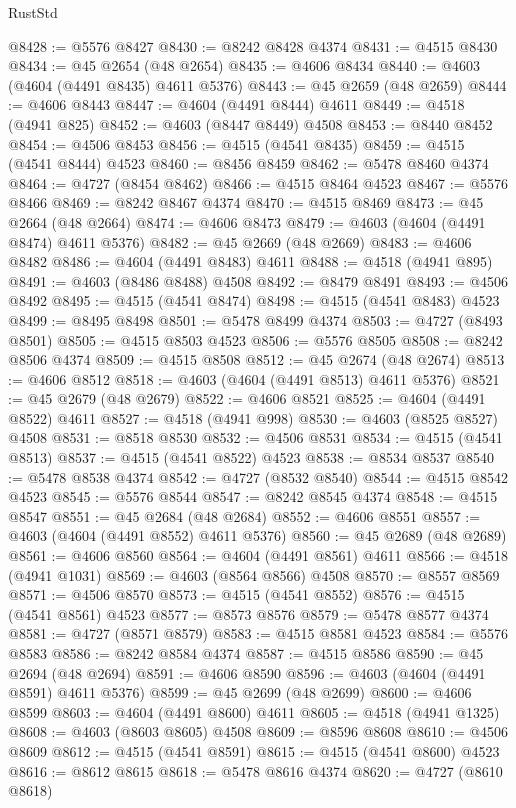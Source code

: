 \begin{lexlean}{RustStd}
\begin{coremodule}
@8428 := @5576 @8427
@8430 := @8242 @8428 @4374
@8431 := @4515 @8430
@8434 := @45 @2654 (@48 @2654)
@8435 := @4606 @8434
@8440 := @4603 (@4604 (@4491 @8435) @4611 @5376)
@8443 := @45 @2659 (@48 @2659)
@8444 := @4606 @8443
@8447 := @4604 (@4491 @8444) @4611
@8449 := @4518 (@4941 @825)
@8452 := @4603 (@8447 @8449) @4508
@8453 := @8440 @8452
@8454 := @4506 @8453
@8456 := @4515 (@4541 @8435)
@8459 := @4515 (@4541 @8444) @4523
@8460 := @8456 @8459
@8462 := @5478 @8460 @4374
@8464 := @4727 (@8454 @8462)
@8466 := @4515 @8464 @4523
@8467 := @5576 @8466
@8469 := @8242 @8467 @4374
@8470 := @4515 @8469
@8473 := @45 @2664 (@48 @2664)
@8474 := @4606 @8473
@8479 := @4603 (@4604 (@4491 @8474) @4611 @5376)
@8482 := @45 @2669 (@48 @2669)
@8483 := @4606 @8482
@8486 := @4604 (@4491 @8483) @4611
@8488 := @4518 (@4941 @895)
@8491 := @4603 (@8486 @8488) @4508
@8492 := @8479 @8491
@8493 := @4506 @8492
@8495 := @4515 (@4541 @8474)
@8498 := @4515 (@4541 @8483) @4523
@8499 := @8495 @8498
@8501 := @5478 @8499 @4374
@8503 := @4727 (@8493 @8501)
@8505 := @4515 @8503 @4523
@8506 := @5576 @8505
@8508 := @8242 @8506 @4374
@8509 := @4515 @8508
@8512 := @45 @2674 (@48 @2674)
@8513 := @4606 @8512
@8518 := @4603 (@4604 (@4491 @8513) @4611 @5376)
@8521 := @45 @2679 (@48 @2679)
@8522 := @4606 @8521
@8525 := @4604 (@4491 @8522) @4611
@8527 := @4518 (@4941 @998)
@8530 := @4603 (@8525 @8527) @4508
@8531 := @8518 @8530
@8532 := @4506 @8531
@8534 := @4515 (@4541 @8513)
@8537 := @4515 (@4541 @8522) @4523
@8538 := @8534 @8537
@8540 := @5478 @8538 @4374
@8542 := @4727 (@8532 @8540)
@8544 := @4515 @8542 @4523
@8545 := @5576 @8544
@8547 := @8242 @8545 @4374
@8548 := @4515 @8547
@8551 := @45 @2684 (@48 @2684)
@8552 := @4606 @8551
@8557 := @4603 (@4604 (@4491 @8552) @4611 @5376)
@8560 := @45 @2689 (@48 @2689)
@8561 := @4606 @8560
@8564 := @4604 (@4491 @8561) @4611
@8566 := @4518 (@4941 @1031)
@8569 := @4603 (@8564 @8566) @4508
@8570 := @8557 @8569
@8571 := @4506 @8570
@8573 := @4515 (@4541 @8552)
@8576 := @4515 (@4541 @8561) @4523
@8577 := @8573 @8576
@8579 := @5478 @8577 @4374
@8581 := @4727 (@8571 @8579)
@8583 := @4515 @8581 @4523
@8584 := @5576 @8583
@8586 := @8242 @8584 @4374
@8587 := @4515 @8586
@8590 := @45 @2694 (@48 @2694)
@8591 := @4606 @8590
@8596 := @4603 (@4604 (@4491 @8591) @4611 @5376)
@8599 := @45 @2699 (@48 @2699)
@8600 := @4606 @8599
@8603 := @4604 (@4491 @8600) @4611
@8605 := @4518 (@4941 @1325)
@8608 := @4603 (@8603 @8605) @4508
@8609 := @8596 @8608
@8610 := @4506 @8609
@8612 := @4515 (@4541 @8591)
@8615 := @4515 (@4541 @8600) @4523
@8616 := @8612 @8615
@8618 := @5478 @8616 @4374
@8620 := @4727 (@8610 @8618)

\end{coremodule}
\end{lexlean}
